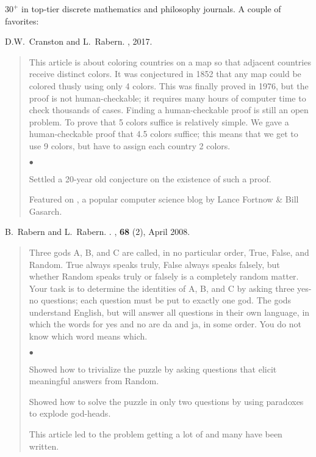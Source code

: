 \documentclass[10pt]{article}
\newcommand{\resheading}[1]{
  \parbox{\textwidth}{
    \begin{shaded}
      \textbf{\sffamily{\mbox{~}{\large #1}}}
    \end{shaded}
  }
}
\newcommand{\squishlist}{
   \begin{list}{$\bullet$}
    { \setlength{\itemsep}{0pt}    \setlength{\parsep}{0pt}
      \setlength{\topsep}{4.5pt}     \setlength{\partopsep}{0pt}
      \setlength{\leftmargin}{2em} \setlength{\labelwidth}{1.5em}
      \setlength{\labelsep}{0.5em} } }
\newcommand{\squishend}{
    \end{list}  }
\begin{document}
\resheading{Research Articles}
{\large$30^+$ \href{https://landon.github.io/#math}{\color{blue}{publications}} in top-tier discrete mathematics and philosophy journals.  
A couple of favorites:}

\vspace{0.25in}
{\large
D.W.~Cranston and L.~Rabern.
\newblock \href{https://landon.github.io/graphdata/Papers/planar%209%20halves.pdf}{\color{blue}{Planar graphs are $\frac92$-colorable}}
, 2017.}

\begin{quote}
This article is about coloring countries on a map so that adjacent countries receive distinct colors.  It was conjectured
in 1852 that any map could be colored thusly using only 4 colors.  This was finally proved in 1976, but the proof is not human-checkable;
it requires many hours of computer time to check thousands of cases.  Finding a human-checkable proof is still an open problem.
To prove that 5 colors suffice is relatively simple.  We gave a human-checkable proof that 4.5 colors suffice; this means that
we get to use 9 colors, but have to assign each country 2 colors.

\squishlist
	\item Settled a 20-year old conjecture on the existence of such a proof.
	\item Featured on 
\href{http://blog.computationalcomplexity.org/2015/10/a-human-readable-proof-that-every.html}{\color{blue}{Computational Complexity}}, a popular computer science blog by Lance Fortnow \& Bill Gasarch.
\squishend
\end{quote}

\vspace{0.5in}
{\large
B.~Rabern and L.~Rabern.
\newblock \href{http://brianrabern.net/sshlpe.pdf}{\color{blue}{A simple solution to the hardest logic puzzle ever}}. 
, \textbf{68} (2), April 2008.}

\begin{quote}
Three gods A, B, and C are called, in no particular order, True, False, and Random. 
True always speaks truly, False always speaks falsely, but whether Random speaks truly or falsely is a completely random matter. 
Your task is to determine the identities of A, B, and C by asking three yes-no questions; each question must be put to exactly one god. 
The gods understand English, but will answer all questions in their own language, in which the words for yes and no are da and ja, in some order. 
You do not know which word means which.
	  \squishlist
		\item Showed how to trivialize the puzzle by asking questions that elicit meaningful answers from Random.
		\item Showed how to solve the puzzle in only two questions by using paradoxes to explode god-heads.
		\item This article led to the problem getting a lot of \href{http://brianrabern.net/New_Scientist_HLPE.pdf}{\color{blue}{press}} 
		and many \href{https://scholar.google.com/scholar?oi=bibs&hl=en&cites=14941881349355280851}{\color{blue}{follow-up papers}} have been written.
      \squishend
\end{quote}
\end{document}
